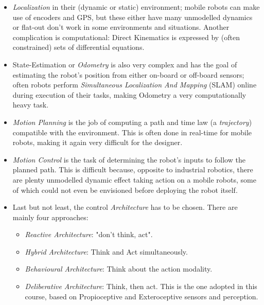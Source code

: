     \begin{itemize}
        \item \textit{Localization} in their (dynamic or static) environment; mobile robots can make use of encoders and GPS, but these either have many unmodelled dynamics or flat-out don't work in some environments and situations. Another complication is computational: Direct Kinematics is expressed by (often constrained) sets of differential equations. 
        \item State-Estimation or \textit{Odometry} is also very complex and has the goal of estimating the robot's position from either on-board or off-board sensors; often robots perform \textit{Simultaneous Localization And Mapping} (SLAM) online during execution of their tasks, making Odometry a very computationally heavy task.
        \item \textit{Motion Planning} is the job of computing a path and time law (a \textit{trajectory}) compatible with the environment. This is often done in real-time for mobile robots, making it again very difficult for the designer.
        \item \textit{Motion Control} is the task of determining the robot's inputs to follow the planned path. This is difficult because, opposite to industrial robotics, there are plenty unmodelled dynamic effect taking action on a mobile robots, some of which could not even be envisioned before deploying the robot itself.
        \item Last but not least, the control \textit{Architecture} has to be chosen. There are mainly four approaches:
        \begin{itemize}
            \item \textit{Reactive Architecture}: "don't think, act".
            \item \textit{Hybrid Architecture}: Think and Act simultaneously.
            \item \textit{Behavioural Architecture}: Think about the action modality.
            \item \textit{Deliberative Architecture}: Think, then act. This is the one adopted in this course, based on Propioceptive and Exteroceptive sensors and perception.
        \end{itemize}
    \end{itemize}

